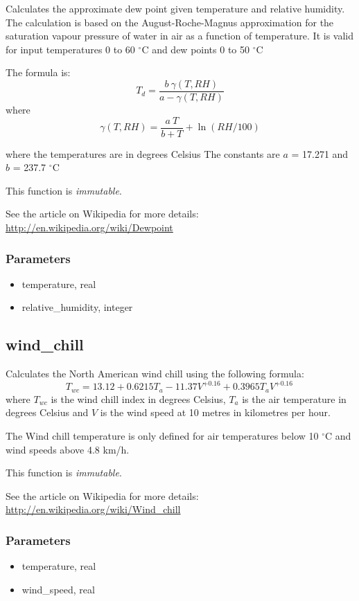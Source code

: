 \documentclass[a4paper,10pt]{book}
\begin{document}
Calculates the approximate dew point given temperature and relative humidity. The calculation is based on the August-Roche-Magnus approximation for the saturation vapour pressure of water in air as a function of temperature. It is valid for input temperatures 0 to 60 $^{\circ}$C and dew points 0 to 50 $^{\circ}$C

The formula is:
$$T_d = \frac {b\ \gamma(T,RH)} {a - \gamma(T,RH)}$$
where
$$\gamma(T,RH) = \frac {a\ T} {b+T} + \ln (RH/100)$$

where the temperatures are in degrees Celsius The constants are $a$ = 17.271 and $b$ = 237.7 $^{\circ}$C

This function is \emph{immutable}.

See the article on Wikipedia for more details: \url{http://en.wikipedia.org/wiki/Dewpoint}

\subsubsection{Parameters}
\begin{itemize}
\item temperature, real
\item relative\_humidity, integer
\end{itemize}

\subsection{wind\_chill}
\label{wind_chill}
Calculates the North American wind chill using the following formula:
$$T_{wc}=13.12 + 0.6215 T_a-11.37 V^{+0.16} + 0.3965 T_a V^{+0.16}\,\!$$
where $T_{wc}$ is the wind chill index in degrees Celsius, $T_a$ is the air temperature in degrees Celsius and $V$ is the wind speed at 10 metres in kilometres per hour.

The Wind chill temperature is only defined for air temperatures below 10 $^{\circ}$C and wind speeds above 4.8 km/h.

This function is \emph{immutable}.

See the article on Wikipedia for more details:
\url{http://en.wikipedia.org/wiki/Wind_chill}

\subsubsection{Parameters}
\begin{itemize}
\item temperature, real
\item wind\_speed, real
\end{itemize}
\end{document}
